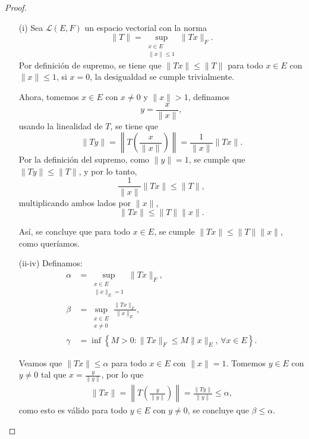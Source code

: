 \begin{proof}
\hfill
\begin{enumerate}
<<<<<< HEAD
=======
>>>>>>> fc6fabea4da37f17c4f0bcc8f9225a0725c0cbb9



 \item[(i)]Sea \(\mathcal{L}(E, F)\) un espacio vectorial con la norma
\[
\|T\| = \sup_{\substack{x \in E \\ \| x\| \leq 1}}\|Tx\|_F.
\]
Por definición de supremo, se tiene que \(\|Tx\| \leq \|T\|\) para todo \(x \in E\) con \(\|x\| \leq 1\), si \(x = 0\), la desigualdad se cumple trivialmente. 

Ahora, tomemos \(x \in E\) con \(x \neq 0\) y $\|x\|>1$, definamos
\[
y = \frac{x}{\|x\|},
\]
 usando la linealidad de \(T\), se tiene que
\[
\|Ty\| = \left\|T\left(\frac{x}{\|x\|}\right)\right\| = \frac{1}{\|x\|} \|Tx\|.
\]
Por la definición del supremo, como \(\|y\| = 1\), se cumple que \(\|Ty\| \leq \|T\|\), y por lo tanto,
\[
\frac{1}{\|x\|} \|Tx\| \leq \|T\|,
\]
multiplicando ambos lados por \(\|x\|\),
\[
\|Tx\| \leq \|T\|\|x\|.
\]

Así, se concluye que para todo \(x \in E\), se cumple \(\|Tx\| \leq \|T\|\|x\|\), como queríamos.

\item[(ii-iv)] Definamos:
\begin{align*}
    \alpha &= \sup_{\substack{x\in E\\ \|x\|_E = 1}} \|T x\|_F,\\
    \beta &= \sup_{\substack{x \in E \\ x \neq 0}} \frac{\|T x\|_F}{\|x\|_E},\\
    \gamma &= \inf \left\{ M > 0 : \|T x\|_F \leq M \|x\|_E, \, \forall x \in E \right\}.
\end{align*}

Veamos que \(\|Tx\| \leq \alpha\) para todo \(x \in E\) con \(\|x\| = 1\).  
Tomemos \(y \in E\) con \(y \neq 0\) tal que \(x = \frac{y}{\|y\|}\), por lo que
\begin{align*}
    \|Tx\| = \left\|T\left(\frac{y}{\|y\|}\right)\right\| = \frac{\|Ty\|}{\|y\|} \leq \alpha,
\end{align*}
como esto es válido para todo \(y \in E\) con \(y \neq 0\), se concluye que \(\beta \leq \alpha\).


\end{enumerate}
\end{proof}
